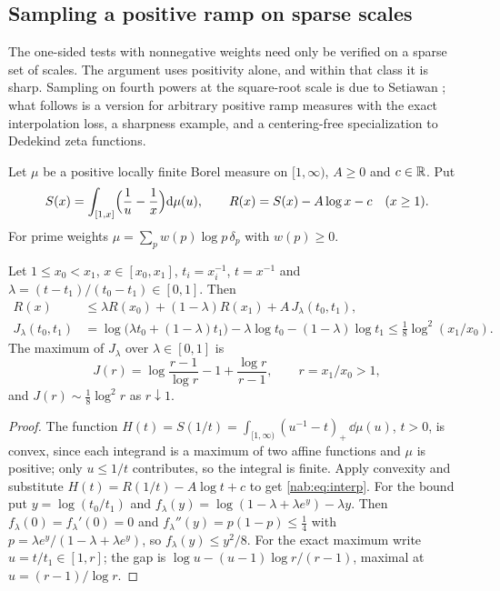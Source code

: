 \subsection{Sampling a positive ramp on sparse scales}\label{nab:sec:sampling}
\begingroup\raggedright
{}
\endgroup

The one-sided tests with nonnegative weights need only be verified on a sparse set of
scales. The argument uses positivity alone, and within that class it is sharp. Sampling on
fourth powers at the square-root scale is due to Setiawan
\cite{Setiawan2026Primacohedron}; what follows is a version for arbitrary positive ramp
measures with the exact interpolation loss, a sharpness example, and a centering-free
specialization to Dedekind zeta functions.

Let $\mu$ be a positive locally finite Borel measure on $[1,\infty)$, $A\ge0$ and $c\in\mathbb{R}$.
Put
\[
 S(x)=\int_{[1,x]}\Bigl(\frac1u-\frac1x\Bigr)\mathrm{d}\mu(u),\qquad R(x)=S(x)-A\log x-c\quad(x\ge1).
\]
For prime weights $\mu=\sum_pw(p)\log p\,\delta_p$ with $w(p)\ge0$.

\begin{lemma}\label{nab:lem:jensen}
Let $1\le x_0<x_1$, $x\in[x_0,x_1]$, $t_i=x_i^{-1}$, $t=x^{-1}$ and
$\lambda=(t-t_1)/(t_0-t_1)\in[0,1]$. Then
\begin{align}
 R(x)&\le\lambda R(x_0)+(1-\lambda)R(x_1)+A\,J_\lambda(t_0,t_1),\label{nab:eq:interp}\\
 J_\lambda(t_0,t_1)&=\log\bigl(\lambda t_0+(1-\lambda)t_1\bigr)-\lambda\log t_0-(1-\lambda)\log t_1
 \le\tfrac18\log^2(x_1/x_0).\label{nab:eq:loggap}
\end{align}
The maximum of $J_\lambda$ over $\lambda\in[0,1]$ is
\[
 J(r)=\log\frac{r-1}{\log r}-1+\frac{\log r}{r-1},\qquad r=x_1/x_0>1,
\]
and $J(r)\sim\tfrac18\log^2r$ as $r\downarrow1$.
\end{lemma}
\begin{proof}
The function $H(t)=S(1/t)=\int_{[1,\infty)}(u^{-1}-t)_+\,\dd\mu(u)$, $t>0$, is convex, since
each integrand is a maximum of two affine functions and $\mu$ is positive; only $u\le1/t$
contributes, so the integral is finite. Apply convexity and substitute
$H(t)=R(1/t)-A\log t+c$ to get \eqref{nab:eq:interp}. For the bound put
$y=\log(t_0/t_1)$ and $f_\lambda(y)=\log(1-\lambda+\lambda e^y)-\lambda y$. Then
$f_\lambda(0)=f_\lambda'(0)=0$ and $f_\lambda''(y)=p(1-p)\le\tfrac14$ with
$p=\lambda e^y/(1-\lambda+\lambda e^y)$, so $f_\lambda(y)\le y^2/8$. For the exact maximum
write $u=t/t_1\in[1,r]$; the gap is $\log u-(u-1)\log r/(r-1)$, maximal at
$u=(r-1)/\log r$.
\end{proof}

